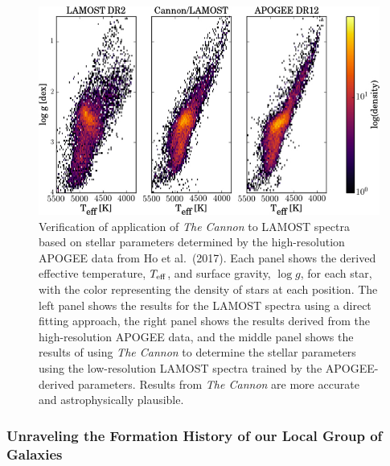\documentclass[oneside,11pt]{amsart}
\begin{document}
\begin{figure}[h!]
%
\vskip -0.1in
%
\includegraphics[width=\textwidth]{CannonLAMOST.jpg}
%
\caption{\small Verification of application of {\it The Cannon} to
LAMOST spectra based on stellar parameters determined by the
high-resolution APOGEE data from Ho et al.\ (2017).  Each panel shows
the derived effective temperature, $T_{\rm eff}$, and surface gravity,
$\log g$, for each star, with the color representing the density of
stars at each position.  The left panel shows the results for the LAMOST
spectra using a direct fitting approach, the right panel shows the
results derived from the high-resolution APOGEE data, and the middle
panel shows the results of using {\it The Cannon} to determine the
stellar parameters using the low-resolution LAMOST spectra trained by
the APOGEE-derived parameters.  Results from {\it The Cannon} are more
accurate and astrophysically plausible.}
%
\label{fig:Cannon}
%
\end{figure}

\subsubsection{Unraveling the Formation History of our Local Group of Galaxies}
\label{sec:localgroup}
\end{document}
